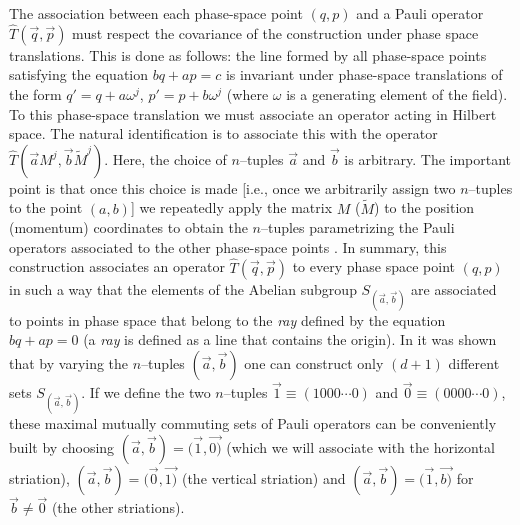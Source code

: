 \documentclass[aps,twocolumn,showpacs,nofootinbib,superscriptaddress]{revtex4}
\begin{document}
The association between each phase-space point $(q,p)$ and a Pauli
operator $\hat{T}(\vec{q},\vec{p})$ must respect the covariance of
the construction under phase space translations. This is done as
follows: the line formed by all phase-space points satisfying the
equation $bq+ap=c$ is invariant under phase-space translations of
the form $q'=q+a\omega^j$, $p'=p+b\omega^j$ (where $\omega$ is a
generating element of the field). To this phase-space translation
we must associate an operator acting in Hilbert space. The natural
identification is to associate this with the operator
$\hat{T}(\vec {a} M^j, \vec {b} \widetilde {M}^j)$. Here, the
choice of $n$--tuples $\vec{a}$ and $\vec{b}$ is arbitrary. The
important point is that once this choice is made [i.e., once we
arbitrarily assign two $n$--tuples to the point $(a,b)$] we
repeatedly apply the matrix $M$ ($\widetilde{M}$) to the position
(momentum) coordinates to obtain the $n$--tuples parametrizing the
Pauli operators associated to the other phase-space points
\cite{PazRS04b}. In summary, this construction associates an
operator $\hat{T}(\vec{q},\vec{p})$ to every phase space point
$(q,p)$ in such a way that the elements of the Abelian subgroup
$S_{(\vec a,\vec b)}$ are associated to points in phase space that
belong to the \textit{ray} defined by the equation $bq+ap=0$ (a
\textit{ray} is defined as a line that contains the origin). In
\cite{PazRS04b} it was shown that by varying the $n$--tuples
$(\vec{a},\vec{b})$ one can construct only $(d+1)$ different sets
$S_{(\vec{a},\vec{b})}$. If we define the two $n$--tuples
$\vec{1}\equiv(1000\cdots0)$ and $\vec{0}\equiv(0000\cdots0)$,
these maximal mutually commuting sets of Pauli operators can be
conveniently built by choosing
$(\vec{a},\vec{b})=(\vec{1},\vec{0)}$ (which we will associate
with the horizontal striation),
$(\vec{a},\vec{b})=(\vec{0},\vec{1)}$ (the vertical striation) and
$(\vec{a},\vec{b})=(\vec{1},\vec{b)}$ for $\vec{b}\neq \vec{0}$
(the other striations).
\end{document}
